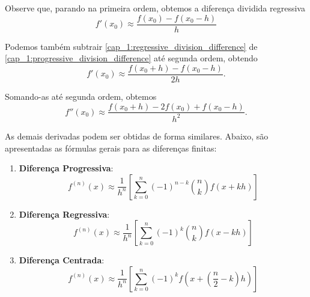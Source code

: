 \documentclass[12pt,openany]{book}
\begin{document}
Observe que, parando na primeira ordem, obtemos a diferença dividida regressiva
\[
    f'(x_0) \approx \frac{f(x_0) - f(x_0 - h)}{h}
\]

Podemos também subtrair \ref{cap_1:regressive_division_difference} de \ref{cap_1:progressive_division_difference} até segunda ordem, obtendo
\[
    f'(x_0) \approx \frac{f(x_0 + h) - f(x_0 - h)}{2h}.
\]

Somando-as até segunda ordem, obtemos
\[
    f''(x_0) \approx \frac{f(x_0 + h) - 2f(x_0) + f(x_0 - h)}{h^2}.
\]

As demais derivadas podem ser obtidas de forma similares.
Abaixo, são apresentadas as fórmulas gerais para as diferenças finitas:

\begin{enumerate}[label=(\roman*)]
    \item \textbf{Diferença Progressiva}:
        \[
            f^{(n)}(x) \approx \frac{1}{h^{n}}\left[ \sum_{k = 0}^{n} (-1)^{n - k} \binom{n}{k} f(x + kh) \right]
        \]
    \item \textbf{Diferença Regressiva}:
        \[
            f^{(n)}(x) \approx \frac{1}{h^{n}}\left[ \sum_{k = 0}^{n} (-1)^{k} \binom{n}{k} f(x - kh) \right]
        \]
    \item \textbf{Diferença Centrada}:
        \[
            f^{(n)}(x) \approx \frac{1}{h^{n}}\left[ \sum_{k = 0}^{n} (-1)^{k} f\left( x + \left(\frac{n}{2} - k \right)h \right) \right]
        \]
\end{enumerate}
\end{document}
